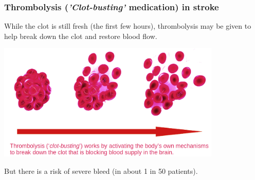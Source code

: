 \begin{frame}
\frametitle{Thrombolysis (\emph{'Clot-busting'} medication) in stroke}

While the clot is still fresh (the first few hours), thrombolysis may be given to help break down the clot and restore blood flow.

\vspace{3mm}

\begin{center}
\includegraphics[width=0.80\textwidth]{./images/thrombolysis_mechanism}
\end{center}

But there is a risk of severe bleed (in about 1 in 50 patients).

\end{frame}